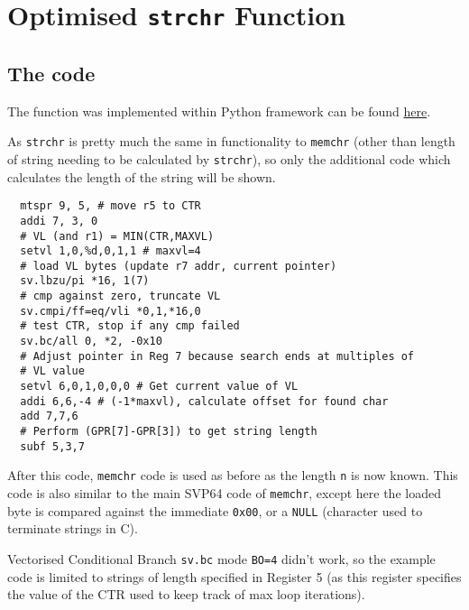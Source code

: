 %

\section{Optimised \texttt{strchr} Function}

\subsection{The code}

The function was implemented within Python framework can be found
\href{https://github.com/ngisearchsvp64/glibc-svp64/blob/master/svp64-port/experimentation/test_strchr.py}{here}.

As \texttt{strchr} is pretty much the same in functionality to \texttt{memchr}
(other than length of string needing to be calculated by \texttt{strchr}), so
only the additional code which calculates the length of the string will be shown.

\begin{verbatim}
  mtspr 9, 5, # move r5 to CTR
  addi 7, 3, 0
  # VL (and r1) = MIN(CTR,MAXVL)
  setvl 1,0,%d,0,1,1 # maxvl=4
  # load VL bytes (update r7 addr, current pointer)
  sv.lbzu/pi *16, 1(7)
  # cmp against zero, truncate VL
  sv.cmpi/ff=eq/vli *0,1,*16,0
  # test CTR, stop if any cmp failed
  sv.bc/all 0, *2, -0x10
  # Adjust pointer in Reg 7 because search ends at multiples of
  # VL value
  setvl 6,0,1,0,0,0 # Get current value of VL
  addi 6,6,-4 # (-1*maxvl), calculate offset for found char
  add 7,7,6
  # Perform (GPR[7]-GPR[3]) to get string length
  subf 5,3,7
\end{verbatim}

After this code, \texttt{memchr} code is used as before as the length
\texttt{n} is now known.
This code is also similar to the main \acrshort{SVP64} code of \texttt{memchr},
except here the loaded byte is compared against the immediate \texttt{0x00},
or a \texttt{NULL} (character used to terminate strings in C).

Vectorised Conditional Branch \texttt{sv.bc} mode \texttt{BO=4} didn't work,
so the example code is limited to strings of length specified in Register 5
(as this register specifies the value of the \acrfull{CTR} used to keep track
of max loop iterations).
